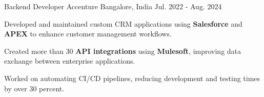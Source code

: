 

\begin{cventries}


  \cventry
    {Backend Developer} %
    {Accenture} %
    {Bangalore, India} %
    {Jul. 2022 - Aug. 2024} %
    {
      \begin{cvitems} %
        \item {Developed and maintained custom CRM applications using \textbf{Salesforce} and \textbf{APEX} to enhance customer management workflows.}
        \item {Created more than 30 \textbf{API integrations} using \textbf{Mulesoft}, improving data exchange between enterprise applications.}
        \item {Worked on automating CI/CD pipelines, reducing development and testing times by over 30 percent.}
      \end{cvitems}
    }



\end{cventries}
